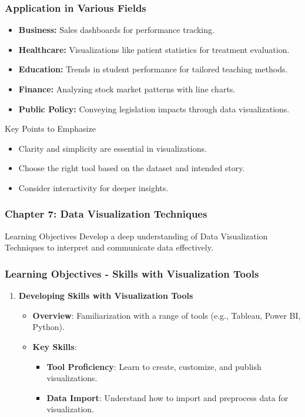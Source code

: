 \documentclass[aspectratio=169]{beamer}
\begin{document}
\begin{frame}[fragile]
    \frametitle{Application in Various Fields}
    \begin{itemize}
        \item \textbf{Business:} Sales dashboards for performance tracking.
        \item \textbf{Healthcare:} Visualizations like patient statistics for treatment evaluation.
        \item \textbf{Education:} Trends in student performance for tailored teaching methods.
        \item \textbf{Finance:} Analyzing stock market patterns with line charts.
        \item \textbf{Public Policy:} Conveying legislation impacts through data visualizations.
    \end{itemize}
    \begin{block}{Key Points to Emphasize}
        \begin{itemize}
            \item Clarity and simplicity are essential in visualizations.
            \item Choose the right tool based on the dataset and intended story.
            \item Consider interactivity for deeper insights.
        \end{itemize}
    \end{block}
\end{frame}

\begin{frame}
    \frametitle{Chapter 7: Data Visualization Techniques}
    \begin{block}{Learning Objectives}
        Develop a deep understanding of Data Visualization Techniques to interpret and communicate data effectively.
    \end{block}
\end{frame}

\begin{frame}
    \frametitle{Learning Objectives - Skills with Visualization Tools}
    \begin{enumerate}
        \item \textbf{Developing Skills with Visualization Tools}
        \begin{itemize}
            \item \textbf{Overview}: Familiarization with a range of tools (e.g., Tableau, Power BI, Python).
            \item \textbf{Key Skills}:
            \begin{itemize}
                \item \textbf{Tool Proficiency}: Learn to create, customize, and publish visualizations.
                \item \textbf{Data Import}: Understand how to import and preprocess data for visualization.
            \end{itemize}
        \end{itemize}
    \end{enumerate}
\end{frame}
\end{document}
